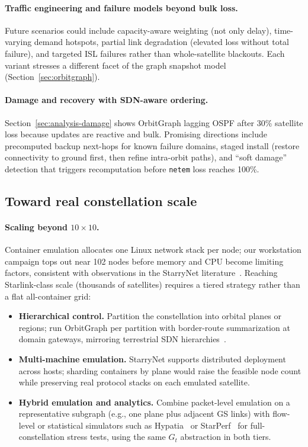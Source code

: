 \paragraph{Traffic engineering and failure models beyond bulk loss.}
Future scenarios could include capacity-aware weighting (not only delay),
time-varying demand hotspots, partial link degradation (elevated loss without
total failure), and targeted ISL failures rather than whole-satellite blackouts.
Each variant stresses a different facet of the graph snapshot model
(Section~\ref{sec:orbitgraph}).

\paragraph{Damage and recovery with SDN-aware ordering.}
Section~\ref{sec:analysis-damage} shows OrbitGraph lagging OSPF after
30\% satellite loss because updates are reactive and bulk.
Promising directions include precomputed backup next-hops for known failure
domains, staged install (restore connectivity to ground first, then refine
intra-orbit paths), and ``soft damage'' detection that triggers recomputation
before \texttt{netem} loss reaches 100\%.

\subsection{Toward real constellation scale}

\paragraph{Scaling beyond $10{\times}10$.}
Container emulation allocates one Linux network stack per node; our workstation
campaign tops out near 102 nodes before memory and CPU become limiting factors,
consistent with observations in the StarryNet literature~\cite{lai2023starrynet}.
Reaching Starlink-class scale (thousands of satellites) requires a tiered
strategy rather than a flat all-container grid:
\begin{itemize}
  \item \textbf{Hierarchical control.} Partition the constellation into orbital
        planes or regions; run OrbitGraph per partition with border-route
        summarization at domain gateways, mirroring terrestrial SDN
        hierarchies~\cite{gregory:satellite-routing:2022}.
  \item \textbf{Multi-machine emulation.} StarryNet supports distributed
        deployment across hosts; sharding containers by plane would raise the
        feasible node count while preserving real protocol stacks on each
        emulated satellite.
  \item \textbf{Hybrid emulation and analytics.} Combine packet-level emulation
        on a representative subgraph (e.g., one plane plus adjacent GS links)
        with flow-level or statistical simulators such as
        Hypatia~\cite{kassing2020exploring} or
        StarPerf~\cite{lai2020starperf} for full-constellation stress tests,
        using the same $G_t$ abstraction in both tiers.
\end{itemize}

